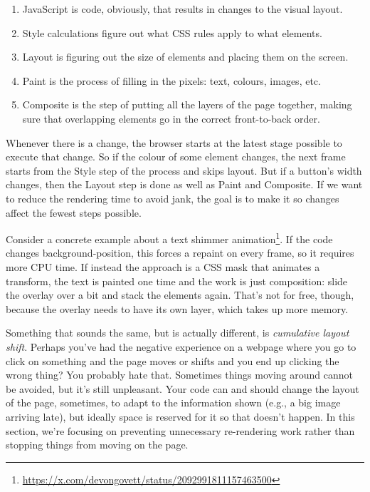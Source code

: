 \begin{enumerate}
	\item JavaScript is code, obviously, that results in changes to the visual layout.
	\item Style calculations figure out what CSS rules apply to what elements.
	\item Layout is figuring out the size of elements and placing them on the screen.
	\item Paint is the process of filling in the pixels: text, colours, images, etc.
	\item Composite is the step of putting all the layers of the page together, making sure that overlapping elements go in the correct front-to-back order.
\end{enumerate}

Whenever there is a change, the browser starts at the latest stage possible to execute that change. So if the colour of some element changes, the next frame starts from the Style step of the process and skips layout. But if a button's width changes, then the Layout step is done as well as Paint and Composite. If we want to reduce the rendering time to avoid jank, the goal is to make it so changes affect the fewest steps possible. 

Consider a concrete example about a text shimmer animation\footnote{ \url{https://x.com/devongovett/status/2092991811157463500}}. If the code changes background-position, this forces a repaint on every frame, so it requires more CPU time. If instead the approach is a CSS mask that animates a transform, the text is painted one time and the work is just composition: slide the overlay over a bit and stack the elements again. That's not for free, though, because the overlay needs to have its own layer, which takes up more memory.

Something that sounds the same, but is actually different, is \textit{cumulative layout shift}. Perhaps you've had the negative experience on a webpage where you go to click on something and the page moves or shifts and you end up clicking the wrong thing? You probably hate that. Sometimes things moving around cannot be avoided, but it's still unpleasant. Your code can and should change the layout of the page, sometimes, to adapt to the information shown (e.g., a big image arriving late), but ideally space is reserved for it so that doesn't happen. In this section, we're focusing on preventing unnecessary re-rendering work rather than stopping things from moving on the page.

